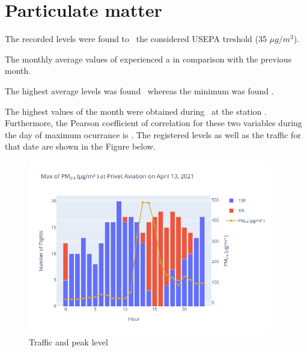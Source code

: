 \documentclass[12pt, oneside]{book}
\begin{document}
\section{Particulate matter}

The recorded  levels were found to \tresholdPMtwofive\ the considered USEPA treshold (35 $\mu g/m^3$).




The monthly average values of  experienced a \monthChangePMtwofive in comparison with the previous month.

The highest average  levels was found \maxDailyPMtwofive\ whereas the minimum was found \minDailyPMtwofive .

The highest  values of the month were obtained during  \dayMaxPMtwofive \ at the station \stationMaxPMtwofive . 
Furthermore, the Pearson coefficient of correlation for these two variables during the day of maximum ocurrance is \correlPMtwofive .  The registered levels as well as the traffic for that date are shown in the Figure below.

{\begin{figure}[H]
\centering
\includegraphics[width=0.95\textwidth, keepaspectratio]{image14}
\caption{Traffic and  peak level}\label{image14}
\end{figure}}{}
\end{document}
